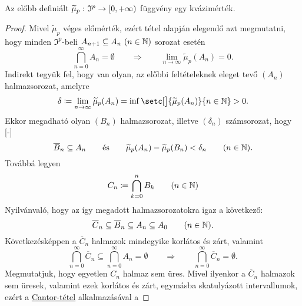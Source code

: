 \documentclass[
]{elteikthesis}[2024/04/26]
\begin{document}
	
	\newpage
	\begin{theorem}{}{}
		Az előbb definiált \( \widetilde{\mu}_p  \,\colon  \mathfrak{I}^p  \to  [0, +\infty) \)
		függvény egy kvázimérték.
	\end{theorem}
	\begin{proof}
		Mivel \( \widetilde{\mu}_p \) véges előmérték, 
		ezért  tétel alapján elegendő azt megmutatni,
		hogy minden \( \mathfrak{I}^p \)-beli \( A_{n+1} \subseteq A_n \ (n \in \mathbb{N}) \)
		sorozat esetén
		\[
			\bigcap_{n=0}^{\infty} A_n = \emptyset
			\qquad \Longrightarrow \qquad
			\lim_{n \to \infty} \widetilde{\mu}_p( A_n ) = 0.
		\]
		Indirekt tegyük fel, hogy van olyan, az előbbi feltételeknek eleget tevő \( (A_n) \) halmazsorozat, amelyre
		\[
			\delta \coloneq
			\lim_{n \to \infty} \widetilde{\mu}_p( A_n ) =
			\inf \setc[\big]{ \widetilde{\mu}_p( A_n ) }{ n \in \N } > 0.
		\]
		Ekkor megadható olyan \( (B_n) \) halmazsorozat, illetve \( (\delta_n) \) számsorozat, hogy
		[-\baselineskip]
		\[
			\overline{B}_n \subseteq A_n
			\qquad \text{és} \qquad
			\widetilde{\mu}_p( A_n ) - \widetilde{\mu}_p( B_n ) < \delta_n
			\qquad (n \in \mathbb{N}).
		\]
		Továbbá legyen
		\[
			C_n \coloneq \bigcap_{k=0}^n B_k \qquad (n \in \mathbb{N})
		\]
		Nyilvánvaló, hogy az így megadott halmazsorozatokra igaz a következő:
		\[
			\overline{C}_n \subseteq 
			\overline{B}_n \subseteq A_n \subseteq A_0 \qquad (n \in \mathbb{N}).
		\]
		Következésképpen a \( \overline{C}_n \) halmazok mindegyike korlátos és zárt, valamint
		\[
			\bigcap_{n=0}^{\infty} \overline{C}_n \subseteq \bigcap_{n=0}^{\infty} A_n = \emptyset
			\qquad \Longrightarrow \qquad
			\bigcap_{n=0}^{\infty} \overline{C}_n = \emptyset.
		\]
		Megmutatjuk, hogy egyetlen \( C_n \) halmaz sem üres.
		Mivel ilyenkor a \( \overline{C}_n \) halmazok sem üresek, 
		valamint ezek korlátos és zárt, egymásba skatulyázott intervallumok, 
		ezért a \hyperref[th:cantor-tétel]{Cantor-tétel} alkalmazásával a
\end{proof}
\end{document}
